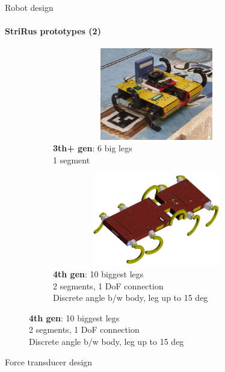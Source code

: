 \documentclass[aspectratio=169]{beamer}
\begin{document}
\begin{frame}[t]{Robot design}
    \framesubtitle{StriRus prototypes (2)}
    \vspace{-0.5cm}
    \begin{figure}[H]
        \begin{subfigure}[t]{0.45\textwidth}
            \centering\includegraphics[height=4cm,width=1\textwidth,keepaspectratio]{strirus_3.JPG}
            \caption*{\textbf{3th+ gen}: 6 big legs \\ 1 segment}
        \end{subfigure}
        \hfill
        \begin{subfigure}[t]{0.45\textwidth}
            \centering\includegraphics[height=4cm,width=1\textwidth,keepaspectratio]{strirus_4.png}
            \caption*{\textbf{4th gen}: 10 biggest legs \\ 2 segments, 1 DoF connection \\  Discrete angle b/w body, leg up to 15 deg}
        \end{subfigure}
        \hfill
    \end{figure}
\end{frame}

\begin{frame}[t]{Force transducer design}
    \framesubtitle{}
\end{frame}
\end{document}

